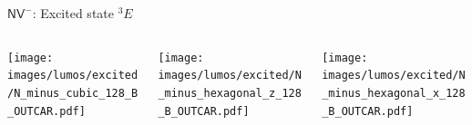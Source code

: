 \documentclass[notes=show]{beamer}
\begin{document}
\begin{frame}{ $ \mathsf{NV}^{-} $: Excited state $ ^3E $ }
  \begin{center}
    \begin{columns}
      \begin{column}{0.3\textwidth}
        \texttt{[image: images/lumos/excited/N\_minus\_cubic\_128\_B\_OUTCAR.pdf]}
      \end{column}
      \begin{column}{0.3\textwidth}
        \texttt{[image: images/lumos/excited/N\_minus\_hexagonal\_z\_128\_B\_OUTCAR.pdf]}
      \end{column}
      \begin{column}{0.3\textwidth}
        \texttt{[image: images/lumos/excited/N\_minus\_hexagonal\_x\_128\_B\_OUTCAR.pdf]}
      \end{column}
    \end{columns}
  \end{center}
\end{frame}
\end{document}
